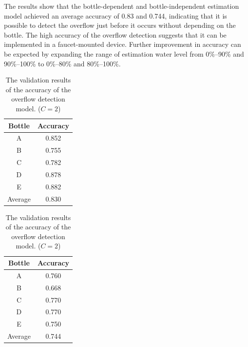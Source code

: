 \documentclass[sigconf]{acmart}
\begin{document}
The results show that the bottle-dependent and bottle-independent estimation model achieved an average accuracy of 0.83 and 0.744, indicating that it is possible to detect the overflow just before it occurs without depending on the bottle. The high accuracy of the overflow detection suggests that it can be implemented in a faucet-mounted device. Further improvement in accuracy can be expected by expanding the range of estimation water level from 0\%--90\% and 90\%--100\% to 0\%--80\% and 80\%--100\%.

\begin{table}[!t]
  \small
  \centering
  \caption{The validation results of the accuracy of the overflow detection model. ($C=2$)}
  \begin{minipage}[t]{0.45\linewidth}
    \centering
    \begin{tabular}{c|c} \hline\hline
    Bottle & Accuracy \\ \hline
    A & 0.852 \\
    B & 0.755 \\
    C & 0.782 \\
    D & 0.878 \\
    E & 0.882 \\ \hline
    Average & 0.830 \\ \hline
    \end{tabular}
    \label{tab:result_2_dependent}
  \end{minipage}
  \begin{minipage}[t]{0.45\linewidth}
    \centering
    \begin{tabular}{c|c} \hline\hline
    Bottle & Accuracy \\ \hline
    A & 0.760 \\
    B & 0.668 \\
    C & 0.770 \\
    D & 0.770 \\
    E & 0.750 \\ \hline
    Average & 0.744 \\ \hline
    \end{tabular}
    \label{tab:result_2_independent}
  \end{minipage}
  \label{tab:result_2}
\end{table}



\end{document}
